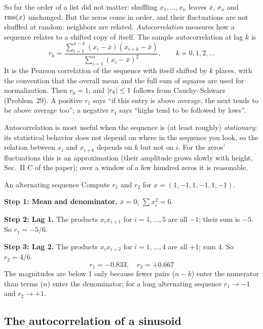 So far the order of a list did not matter: shuffling $x_1,\dots,x_n$ leaves $\bar x$, $\sigma_x$ and $\mathrm{rms}(x)$ unchanged. But the zeros come in order, and their fluctuations are not shuffled at random: neighbors are related. \emph{Autocorrelation} measures how a sequence relates to a shifted copy of itself. The sample autocorrelation at lag $k$ is
\begin{equation}
r_k = \frac{\sum_{i=1}^{n-k}(x_i-\bar x)(x_{i+k}-\bar x)}{\sum_{i=1}^{n}(x_i-\bar x)^2},\qquad k=0,1,2,\dots
\label{eq:probability-acf}
\end{equation}
It is the Pearson correlation of the sequence with itself shifted by $k$ places, with the convention that the overall mean and the full sum of squares are used for normalization. Then $r_0=1$, and $\left\lvert r_k\right\rvert\le1$ follows from Cauchy--Schwarz (Problem~29). A positive $r_1$ says ``if this entry is above average, the next tends to be above average too''; a negative $r_1$ says ``highs tend to be followed by lows''.

Autocorrelation is most useful when the sequence is (at least roughly) \emph{stationary}: its statistical behavior does not depend on where in the sequence you look, so the relation between $x_i$ and $x_{i+k}$ depends on $k$ but not on $i$. For the zeros' fluctuations this is an approximation (their amplitude grows slowly with height, Sec.~II C of the paper); over a window of a few hundred zeros it is reasonable.

\begin{sample}{An alternating sequence}
Compute $r_1$ and $r_2$ for $x=(1,-1,1,-1,1,-1)$.

\textbf{Step 1: Mean and denominator.} $\bar x=0$; $\sum x_i^2=6$.

\textbf{Step 2: Lag 1.} The products $x_ix_{i+1}$ for $i=1,\dots,5$ are all $-1$; their sum is $-5$. So $r_1=-5/6$.

\textbf{Step 3: Lag 2.} The products $x_ix_{i+2}$ for $i=1,\dots,4$ are all $+1$; sum $4$. So $r_2=4/6$.
\[
\boxed{r_1=-0.833,\quad r_2=+0.667}
\]
The magnitudes are below 1 only because fewer pairs ($n-k$) enter the numerator than terms ($n$) enter the denominator; for a long alternating sequence $r_1\to-1$ and $r_2\to+1$.
\end{sample}

\subsection{The autocorrelation of a sinusoid}

